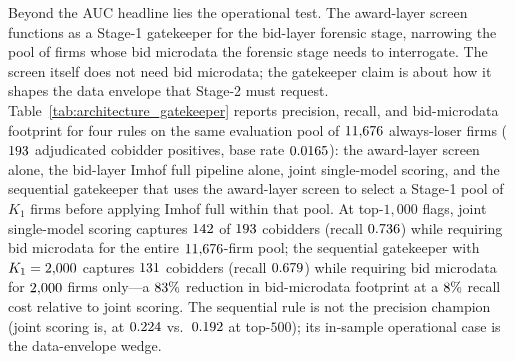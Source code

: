 Beyond the AUC headline lies the operational test. The
award-layer screen functions as a Stage-1 gatekeeper for the
bid-layer forensic stage, narrowing the pool of firms whose bid
microdata the forensic stage needs to interrogate. The screen
itself does not need bid microdata; the gatekeeper claim is
about how it shapes the data envelope that Stage-2 must request.
Table~\ref{tab:architecture_gatekeeper} reports precision,
recall, and bid-microdata footprint for four rules on the same
evaluation pool of $11{,}676$ always-loser firms
($193$ adjudicated cobidder positives, base rate
$0.0165$): the award-layer screen alone, the bid-layer
Imhof full pipeline alone, joint single-model scoring, and the
sequential gatekeeper that uses the award-layer screen to select
a Stage-1 pool of $K_1$ firms before applying Imhof full within
that pool. At top-$1{,}000$
flags, joint single-model scoring captures
$142$ of $193$ cobidders (recall
$0.736$) while requiring bid microdata for the
entire $11{,}676$-firm pool; the sequential gatekeeper
with $K_1=2{,}000$ captures $131$
cobidders (recall $0.679$) while requiring bid
microdata for $2{,}000$ firms only---a
$83\%$ reduction in bid-microdata
footprint at a $8\%$ recall cost relative to
joint scoring. The sequential rule is not the precision
champion (joint scoring is, at $0.224$
vs.\ $0.192$ at top-$500$); its in-sample
operational case is the data-envelope wedge.



